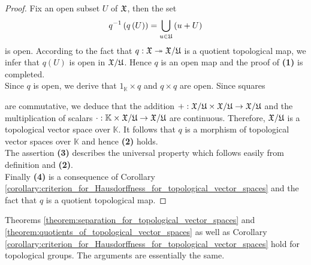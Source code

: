 \begin{proof}
Fix an open subset $U$ of ${\mathfrak X}$, then the set 
$$q^{-1}\left(q\left(U\right)\right) = \bigcup_{u \in {\mathfrak U}}\left(u + U\right)$$
is open. According to the fact that $q:{\mathfrak X}\twoheadrightarrow {\mathfrak X}/{\mathfrak U}$ is a quotient topological map, we infer that $q(U)$ is open in ${\mathfrak X}/{\mathfrak U}$. Hence $q$ is an open map and the proof of \textbf{(1)} is completed.\\
Since $q$ is open, we derive that $1_{\mathbb{K}}\times q$ and $q\times q$ are open. Since squares
\begin{center}
\end{center}
are commutative, we deduce that the addition $+:{\mathfrak X}/{\mathfrak U} \times {\mathfrak X}/{\mathfrak U} \rightarrow {\mathfrak X}/{\mathfrak U}$ and the multiplication of scalars $\cdot:\mathbb{K}\times {\mathfrak X}/{\mathfrak U}\rightarrow {\mathfrak X}/{\mathfrak U}$ are continuous. Therefore, ${\mathfrak X}/{\mathfrak U}$ is a topological vector space over $\mathbb{K}$. It follows that $q$ is a morphism of topological vector spaces over $\mathbb{K}$ and hence \textbf{(2)} holds.\\
The assertion \textbf{(3)} describes the universal property which follows easily from definition and \textbf{(2)}.\\
Finally \textbf{(4)} is a consequence of Corollary \ref{corollary:criterion_for_Hausdorffness_for_topological_vector_spaces} and the fact that $q$ is a quotient topological map.  
\end{proof}

\begin{remark}\label{remark:quotient_map_for_topological_groups}
Theorems \ref{theorem:separation_for_topological_vector_spaces} and \ref{theorem:quotients_of_topological_vector_spaces} as well as Corollary \ref{corollary:criterion_for_Hausdorffness_for_topological_vector_spaces} hold for topological groups. The arguments are essentially the same.
\end{remark}

